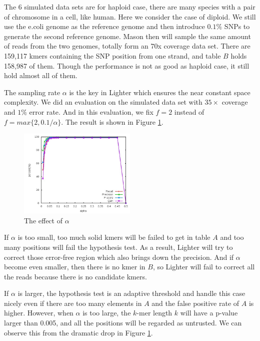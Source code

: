 \documentclass[10pt]{article}
\begin{document}
The 6 simulated data sets are for haploid case, there are many species with a pair of chromosome in a cell, like human. Here we consider the case of diploid. We still use the e.coli genome as the reference genome and then introduce $0.1\%$ SNPs to generate the second reference genome. Mason then will sample the same amount of reads from the two genomes, totally form an $70$x coverage data set. There are 159,117 kmers containing the SNP position from one strand, and table $B$ holds 158,987 of them. Though the performance is not as good as haploid case, it still hold almost all of them. 

The sampling rate $\alpha$ is the key in Lighter which ensures the near constant space complexity. We did an evaluation on the simulated data set with $35\times$ coverage and $1\%$ error rate. And in this evaluation, we fix $f=2$ instead of $f=max\{2,0.1/\alpha\}$. The result is shown in Figure \ref{fig:alpha}.

\begin{figure}[h!]
\begin{center}
\includegraphics[width=0.5\textwidth]{alpha.jpg}
\caption{The effect of $\alpha$\label{fig:alpha}}
\end{center}
\end{figure}

If $\alpha$ is too small, too much solid kmers will be failed to get in table $A$ and too many positions will fail the hypothesis test. As a result, Lighter will try to correct those error-free region which also brings down the precision. And if $\alpha$ become even smaller, then there is no kmer in $B$, so Lighter will fail to correct all the reads because there is no candidate kmers. 

If $\alpha$ is larger, the hypothesis test is an adaptive threshold and handle this case nicely even if there are too many elements in $A$ and the false positive rate of $A$ is higher. However, when $\alpha$ is too large, the $k$-mer length $k$ will have a p-value larger than 0.005, and all the positions will be regarded as untrusted. We can observe this from the dramatic drop in Figure \ref{fig:alpha}.
\end{document}
